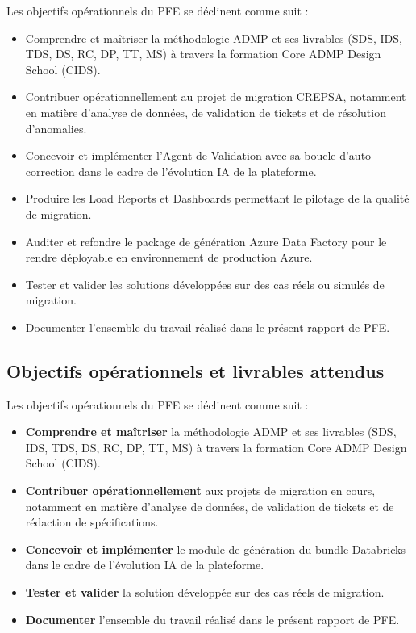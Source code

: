 Les objectifs opérationnels du PFE se déclinent comme suit :

\begin{itemize}
    \item Comprendre et maîtriser la méthodologie ADMP et ses livrables (SDS, IDS, TDS, DS, RC, DP, TT, MS) à travers la formation Core ADMP Design School (CIDS).
    \item Contribuer opérationnellement au projet de migration CREPSA, notamment en matière d'analyse de données, de validation de tickets et de résolution d'anomalies.
    \item Concevoir et implémenter l'Agent de Validation avec sa boucle d'auto-correction dans le cadre de l'évolution IA de la plateforme.
    \item Produire les Load Reports et Dashboards permettant le pilotage de la qualité de migration.
    \item Auditer et refondre le package de génération Azure Data Factory pour le rendre déployable en environnement de production Azure.
    \item Tester et valider les solutions développées sur des cas réels ou simulés de migration.
    \item Documenter l'ensemble du travail réalisé dans le présent rapport de PFE.
\end{itemize}


\subsection{Objectifs opérationnels et livrables attendus}
\label{subsec:objectifs}

Les objectifs opérationnels du PFE se déclinent comme suit :

\begin{itemize}[leftmargin=*]
    \item \textbf{Comprendre et maîtriser} la méthodologie ADMP et ses livrables (SDS, IDS, TDS, DS, RC, DP, TT, MS) à travers la formation Core ADMP Design School (CIDS).
    \item \textbf{Contribuer opérationnellement} aux projets de migration en cours, notamment en matière d'analyse de données, de validation de tickets et de rédaction de spécifications.
    \item \textbf{Concevoir et implémenter} le module de génération du bundle Databricks dans le cadre de l'évolution IA de la plateforme.
    \item \textbf{Tester et valider} la solution développée sur des cas réels de migration.
    \item \textbf{Documenter} l'ensemble du travail réalisé dans le présent rapport de PFE.
\end{itemize}



